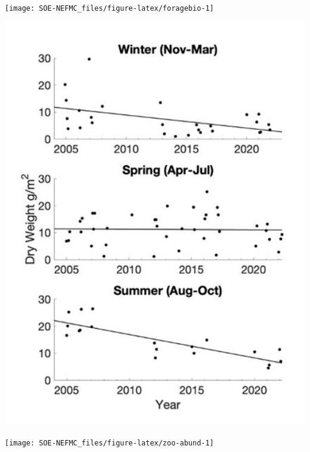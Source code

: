 \documentclass[
  10pt,
]{article}
\let\origfigure\figure
\let\endorigfigure\endfigure
\renewenvironment{figure}[1][2] {
    \expandafter\origfigure\expandafter[H]
} {
    \endorigfigure
}
\begin{document}
\begin{figure}

{\centering \texttt{[image: SOE-NEFMC\_files/figure-latex/foragebio-1]} 

}

\caption{Forage fish index in GB (left) and GOM (right) for spring (blue) and fall (red) surveys. Index values are relative to the maximum observation within a region across surveys.}\label{fig:foragebio}
\end{figure}
\begin{figure}

{\centering \includegraphics[width=5.92in]{SOE-NEFMC_files/figure-latex/zooplankton-season-1} 

}

\caption{Dry mass of mesozooplankton captured with a 200µm ring net towed from the bottom to surface at a deep time series station  in Wilkinson Basin between 2005-2022 (Runge et al. 2023).}\label{fig:zooplankton-season}
\end{figure}
\begin{figure}

{\centering \texttt{[image: SOE-NEFMC\_files/figure-latex/zoo-abund-1]} 

}

\caption{Georges Bank (GB) and Gulf of Maine (GOM) abundance anomalies three dominante zooplankton (\textit{Calanus finmarchicus}, \textit{Calanus typicus}, and \textit{Pseudocalanus spp}.).}\label{fig:zoo-abund}
\end{figure}
\end{document}
